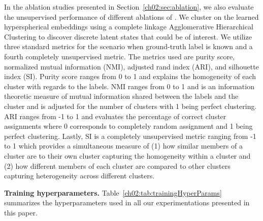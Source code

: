 In the ablation studies presented in Section~\ref{ch02:sec:ablation}, we also evaluate the unsupervised performance of different ablations of .
We cluster on the learned hyperspherical embeddings using a complete linkage Agglomerative Hierarchical Clustering to discover discrete latent states that could be of interest.  
We utilize three standard metrics for the scenario when ground-truth label is known and a fourth completely unsupervised metric.
The metrics used are purity score, normalized mutual information (NMI), adjusted rand index (ARI), and silhouette index (SI).
Purity score ranges from 0 to 1 and explains the homogeneity of each cluster with regards to the labels.
NMI ranges from 0 to 1 and is an information theoretic measure of mutual information shared between the labels and the cluster and is adjusted for the number of clusters with 1 being perfect clustering.
ARI ranges from -1 to 1 and evaluates the percentage of correct cluster assignments where 0 corresponds to completely random assignment and 1 being perfect clustering.
Lastly, SI is a completely unsupervised metric ranging from -1 to 1 which provides a simultaneous measure of (1) how similar members of a cluster are to their own cluster capturing the homogeneity within a cluster and (2) how different members of each cluster are compared to other clusters capturing heterogeneity across different clusters.


\noindent
\textbf{Training hyperparameters.}
Table~\ref{ch02:tab:trainingHyperParams} summarizes the hyperparameters used in all our experimentations presented in this paper.
{



}

